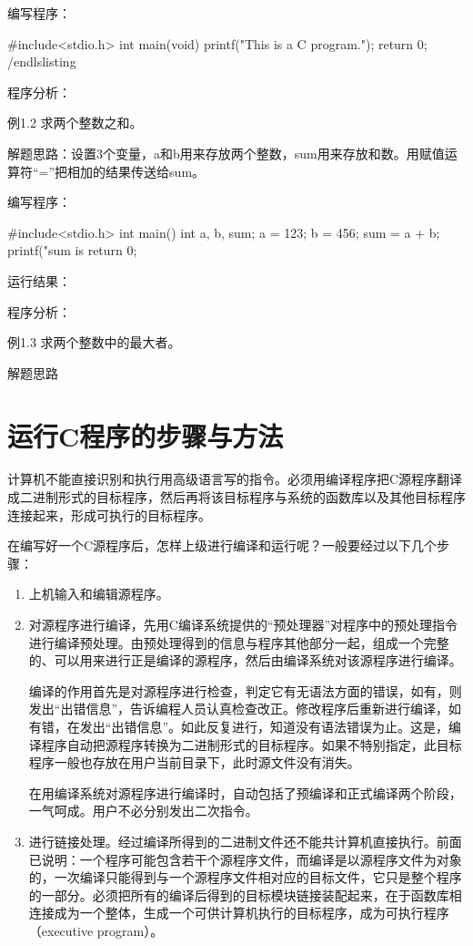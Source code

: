 编写程序：
\begin{lslisting}
#include<stdio.h>
int main(void)
{
	printf("This is a C program.\n");
	return 0;
}
/end{lslisting}

程序分析：

例1.2 求两个整数之和。

解题思路：设置3个变量，a和b用来存放两个整数，sum用来存放和数。用赋值运算符“=”把相加的结果传送给sum。

编写程序：
\begin{lslisting}
#include<stdio.h>
int main()
{
	int a, b, sum;
	a = 123;
	b = 456;
	sum = a + b;
	printf("sum is %
	return 0;
}
\end{lslisting}
运行结果：

程序分析：

例1.3 求两个整数中的最大者。

解题思路

\section{运行C程序的步骤与方法}

 计算机不能直接识别和执行用高级语言写的指令。必须用编译程序把C源程序翻译成二进制形式的目标程序，然后再将该目标程序与系统的函数库以及其他目标程序连接起来，形成可执行的目标程序。

 在编写好一个C源程序后，怎样上级进行编译和运行呢？一般要经过以下几个步骤：
\begin{enumerate}
	\item 	上机输入和编辑源程序。
	\item 对源程序进行编译，先用C编译系统提供的“预处理器”对程序中的预处理指令进行编译预处理。由预处理得到的信息与程序其他部分一起，组成一个完整的、可以用来进行正是编译的源程序，然后由编译系统对该源程序进行编译。

 编译的作用首先是对源程序进行检查，判定它有无语法方面的错误，如有，则发出“出错信息”，告诉编程人员认真检查改正。修改程序后重新进行编译，如有错，在发出“出错信息”。如此反复进行，知道没有语法错误为止。这是，编译程序自动把源程序转换为二进制形式的目标程序。如果不特别指定，此目标程序一般也存放在用户当前目录下，此时源文件没有消失。

 在用编译系统对源程序进行编译时，自动包括了预编译和正式编译两个阶段，一气呵成。用户不必分别发出二次指令。

	\item 进行链接处理。经过编译所得到的二进制文件还不能共计算机直接执行。前面已说明：一个程序可能包含若干个源程序文件，而编译是以源程序文件为对象的，一次编译只能得到与一个源程序文件相对应的目标文件，它只是整个程序的一部分。必须把所有的编译后得到的目标模块链接装配起来，在于函数库相连接成为一个整体，生成一个可供计算机执行的目标程序，成为可执行程序（executive program）。


\end{enumerate}
\end{lslisting}
